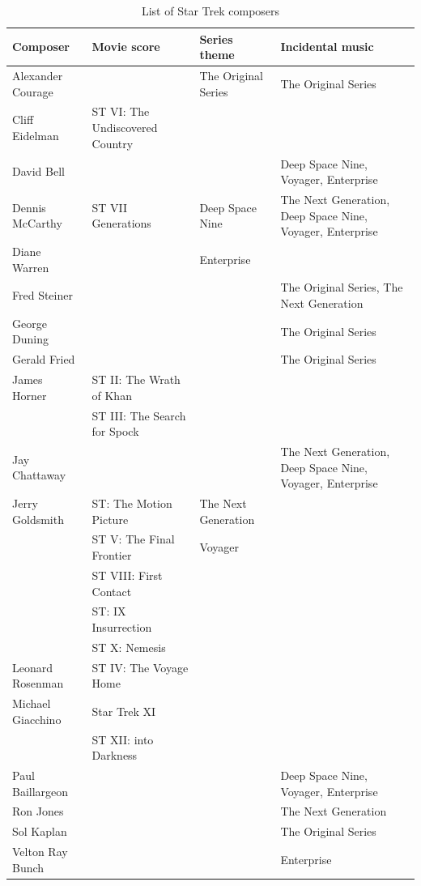 \begin{table}
\small
\begin{tabularx}{\linewidth}{lllX}
\toprule
	\textbf{Composer}	& \textbf{Movie score} 				& \textbf{Series theme} 			& \textbf{Incidental music} \\
\midrule
	Alexander Courage 	& 								& The Original Series 			& The Original Series \\
	Cliff Eidelman 		& ST VI: The Undiscovered Country 		&  							&  \\
	David Bell			&  								&  							& Deep Space Nine, Voyager, Enterprise \\
	Dennis McCarthy 	& ST VII Generations 				& Deep Space Nine 				& The Next Generation, Deep Space Nine, Voyager, Enterprise \\
	Diane Warren 		&  								& Enterprise 					&  \\
	Fred Steiner 		&  								&  							& The Original Series, The Next Generation \\
	George Duning 	&  								&  							& The Original Series \\
	Gerald Fried 		& 								&  							& The Original Series \\
	James Horner 		& ST II: The Wrath of Khan			&  							&  \\
					& ST III: The Search for Spock 			&  							&  \\
	Jay Chattaway 		&  								& 							& The Next Generation, Deep Space Nine, Voyager, Enterprise  \\
	Jerry Goldsmith 	& ST: The Motion Picture				& The Next Generation   			&  \\
					& ST V: The Final Frontier				& Voyager						&  \\
					& ST VIII: First Contact				& 		 					&  \\
					& ST: IX Insurrection					&  							&  \\
					& ST X: Nemesis 					&  							&  \\
	Leonard Rosenman 	& ST IV: The Voyage Home 			&  							&  \\
	Michael Giacchino 	& Star Trek XI						&							&  \\
					& ST XII: into Darkness 				&  							&  \\
	Paul Baillargeon 	&  								& 							& Deep Space Nine, Voyager, Enterprise \\
	Ron Jones 		&  								&  							& The Next Generation \\
	Sol Kaplan 		&  								&  							& The Original Series \\
	Velton Ray Bunch 	&  								&  							& Enterprise \\
\bottomrule
\end{tabularx}
\caption{List of Star Trek composers}
\label{tb:star trek composers}
\end{table}

